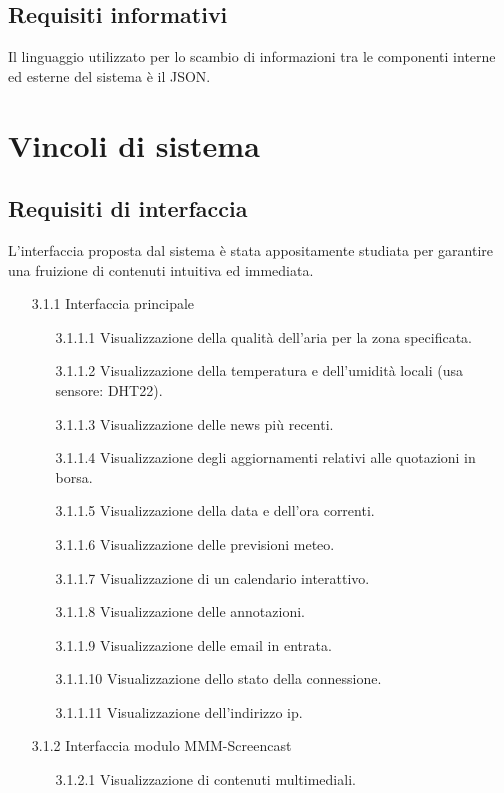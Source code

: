 \documentclass[a4paper,11pt,titlepage]{article}       %
\begin{document}
    \subsection{Requisiti informativi}
        Il linguaggio utilizzato per lo scambio di informazioni tra le componenti interne ed esterne del sistema è il JSON.

\newpage

\section{Vincoli di sistema}
    
    \subsection{Requisiti di interfaccia}
        L'interfaccia proposta dal sistema è stata appositamente studiata per garantire una fruizione di contenuti intuitiva ed immediata.
        
        \begin{itemize}
            \item[3.1.1] Interfaccia principale
                \begin{itemize}
                    \item[3.1.1.1] Visualizzazione della qualità dell'aria per la zona specificata.
                    \item[3.1.1.2] Visualizzazione della temperatura e dell'umidità locali (usa sensore: DHT22).
                    \item[3.1.1.3] Visualizzazione delle news più recenti.
                    \item[3.1.1.4] Visualizzazione degli aggiornamenti relativi alle quotazioni in borsa.
                    \item[3.1.1.5] Visualizzazione della data e dell'ora correnti.
                    \item[3.1.1.6] Visualizzazione delle previsioni meteo.
                    \item[3.1.1.7] Visualizzazione di un calendario interattivo.
                    \item[3.1.1.8] Visualizzazione delle annotazioni.
                    \item[3.1.1.9] Visualizzazione delle email in entrata.
                    \item[3.1.1.10] Visualizzazione dello stato della connessione.
                    \item[3.1.1.11] Visualizzazione dell'indirizzo ip.
                \end{itemize}   
                
            \item[3.1.2] Interfaccia modulo MMM-Screencast
                \begin{itemize}
                    \item[3.1.2.1] Visualizzazione di contenuti multimediali.
                \end{itemize}
        \end{itemize}
    
\end{document}
